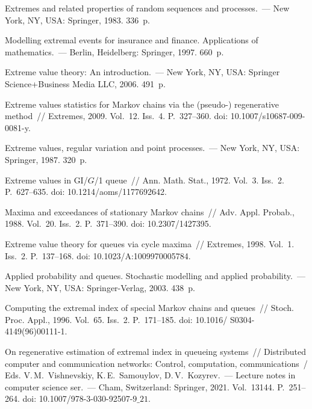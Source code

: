 \begin{multicols}{2}
{\small\frenchspacing
 {%
 \begin{thebibliography}{99}
  Extremes 
and related properties of random sequences
and processes.~--- New York, NY, USA: Springer,  1983. 336~p.


 Modelling extremal events for 
insurance and finance. Applications of mathematics.~--- Berlin, Heidelberg:   
Springer, 1997. 660~p.

  Extreme value theory:  An introduction.~---   New 
York, NY, USA:  Springer Science\;+\;Business Media LLC, 2006. 491~p.


Extreme values statistics for Markov chains via the
(pseudo-) regenerative method~// Extremes, 2009.  Vol.~12. Iss.~4. P.~327--360.   
doi: 10.1007/s10687-009-0081-y.

  Extreme values, regular variation and point 
processes.~--- New York, NY, USA: Springer,  1987. 320~p.




  Extreme values in GI/$G$/1 queue~// Ann. 
Math. Stat., 1972. Vol.~3. Iss.~2. P.~627--635. doi: 10.1214/aoms/1177692642.




 Maxima and exceedances of stationary Markov 
chains~// Adv. Appl. Probab., 1988. Vol.~20. Iss.~2. P.~371--390. 
doi: 10.2307/1427395.

 Extreme value theory for queues via cycle maxima~// Extremes, 
1998. Vol.~1. Iss.~2. P.~137--168. doi: 10.1023/A:1009970005784.

 Applied probability and queues. Stochastic modelling and 
applied probability.~--- New York, NY, USA: Springer-Verlag, 2003. 438~p.



 Computing the extremal index of special
Markov chains and queues~// Stoch. Proc. Appl., 1996. 
Vol.~65. Iss.~2. P.~171--185. doi: 10.1016/ S0304-4149(96)00111-1.



 On regenerative 
estimation of extremal index in queueing systems~// Distributed computer and 
communication networks: Control, computation, communications~/
Eds. V.\,M.~Vishnevskiy,
K.\,E.~Samouylov, D.\,V.~Kozyrev.~--- 
Lecture notes in computer science ser.~--- Cham, Switzerland: 
Springer, 2021. Vol.~13144. P.~251--264. doi: 10.1007/978-3-030-92507-$9\_21$.


\end{thebibliography}}}
\end{multicols}

